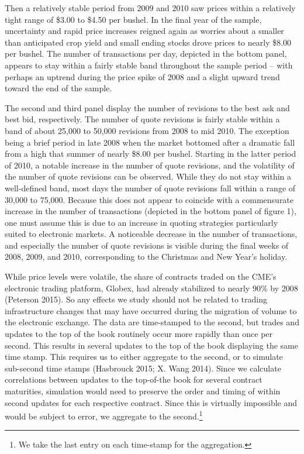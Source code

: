 \documentclass[]{elsarticle} %
\begin{document}
Then a relatively stable period from 2009 and 2010 saw prices within a
relatively tight range of \$3.00 to \$4.50 per bushel. In the final year
of the sample, uncertainty and rapid price increases reigned again as
worries about a smaller than anticipated crop yield and small ending
stocks drove prices to nearly \$8.00 per bushel. The number of
transactions per day, depicted in the bottom panel, appears to stay
within a fairly stable band throughout the sample period -- with perhaps
an uptrend during the price spike of 2008 and a slight upward trend
toward the end of the sample.

The second and third panel display the number of revisions to the best
ask and best bid, respectively. The number of quote revisions is fairly
stable within a band of about 25,000 to 50,000 revisions from 2008 to
mid 2010. The exception being a brief period in late 2008 when the
market bottomed after a dramatic fall from a high that summer of nearly
\$8.00 per bushel. Starting in the latter period of 2010, a notable
increase in the number of quote revisions, and the volatility of the
number of quote revisions can be observed. While they do not stay within
a well-defined band, most days the number of quote revisions fall within
a range of 30,000 to 75,000. Because this does not appear to coincide
with a commensurate increase in the number of transactions (depicted in
the bottom panel of figure 1), one must assume this is due to an
increase in quoting strategies particularly suited to electronic
markets. A noticeable decrease in the number of transactions, and
especially the number of quote revisions is visible during the final
weeks of 2008, 2009, and 2010, corresponding to the Christmas and New
Year's holiday.

While price levels were volatile, the share of contracts traded on the
CME's electronic trading platform, Globex, had already stabilized to
nearly 90\% by 2008 (Peterson 2015). So any effects we study should not
be related to trading infrastructure changes that may have occurred
during the migration of volume to the electronic exchange. The data are
time-stamped to the second, but trades and updates to the top of the
book routinely occur more rapidly than once per second. This results in
several updates to the top of the book displaying the same time stamp.
This requires us to either aggregate to the second, or to simulate
sub-second time stamps (Hasbrouck 2015; X. Wang 2014). Since we
calculate correlations between updates to the top-of-the book for
several contract maturities, simulation would need to preserve the order
and timing of within second updates for each respective contract. Since
this is virtually impossible and would be subject to error, we aggregate
to the second.\footnote{We take the last entry on each time-stamp for
  the aggregation.}
\end{document}
